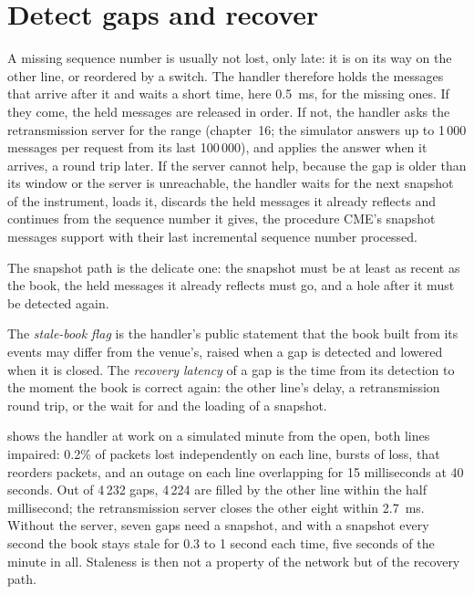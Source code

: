 \section{Detect gaps and recover}

A missing sequence number is usually not lost, only late: it is on its way on the other line, or reordered by a switch.
The handler therefore holds the messages that arrive after it and waits a short time, here \qty{0.5}{\milli\second}, for the
missing ones. If they come, the held messages are released in order. If not, the handler asks the retransmission server for
the range (chapter~16; the simulator answers up to 1\,000 messages per request from its last 100\,000), and applies the answer
when it arrives, a round trip later. If the server cannot help, because the gap is older than its window or the server is
unreachable, the handler waits for the next snapshot of the instrument, loads it, discards the held messages it already
reflects and continues from the sequence number it gives, the procedure CME's snapshot messages support with their last
incremental sequence number processed.

\label{lst:ll:the-feed-handler:incremental}

The snapshot path is the delicate one: the snapshot must be at least as recent as the book, the held messages it already
reflects must go, and a hole after it must be detected again.

\label{lst:ll:the-feed-handler:snapshot}

\begin{definition}\label{def:ll:the-feed-handler:stale}
The \emph{stale-book flag} is the handler's public statement that the book built from its events may
differ from the venue's, raised when a gap is detected and lowered when it is closed. The \emph{recovery latency} of a gap is the time from its detection to the moment the book is correct again: the other line's delay, a
retransmission round trip, or the wait for and the loading of a snapshot.
\end{definition}

 shows the handler at work on a simulated minute from the open, both lines impaired: 0.2\%
of packets lost independently on each line, bursts of loss,  that reorders packets, and an outage on each line
overlapping for 15 milliseconds at 40 seconds. Out of 4\,232 gaps, 4\,224 are filled by the other line within the half
millisecond; the retransmission server closes the other eight within \qty{2.7}{\milli\second}. Without the server, seven gaps
need a snapshot, and with a snapshot every second the book stays stale for 0.3 to 1 second each time, five seconds of the
minute in all. Staleness is then not a property of the network but of the recovery path.

